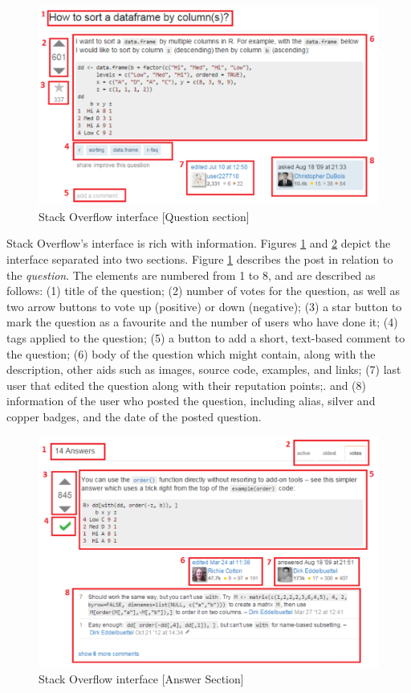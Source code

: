 \documentclass{sig-alternate-05-2015}
\begin{document}
	\begin{figure}[!htb]
	\centering
	\includegraphics[width=\columnwidth]{Figures/SOInterface_A}
	\caption{Stack Overflow interface [Question section]}
	\label{fig:SOInterface_A}
	\end{figure}

	Stack Overflow's interface is rich with information. Figures \ref{fig:SOInterface_A} and \ref{fig:SOInterface_B} depict the interface separated into two sections. Figure \ref{fig:SOInterface_A} describes the post in relation to the \textit{question}.
	The elements are numbered from 1 to 8, and are described as follows:
	(1) title of the question;
	(2) number of votes for the question, as well as two arrow buttons to vote up (positive) or down (negative);
	(3) a star button to mark the question as a favourite and the number of users who have done it;
	(4) tags applied to the question;
	(5) a button to add a short, text-based comment to the question;
	(6) body of the question which might contain, along with the description, other aids such as images, source code, examples, and links;
	(7) last user that edited the question along with their reputation points;.
	and (8) information of the user who posted the question, including alias, silver and copper badges, and the date of the posted question.

	\begin{figure}[!htb]
	\centering
	\includegraphics[width=\columnwidth]{Figures/SOInterface_B}
	\caption{Stack Overflow interface [Answer Section]}
	\label{fig:SOInterface_B}
	\end{figure}
\end{document}

